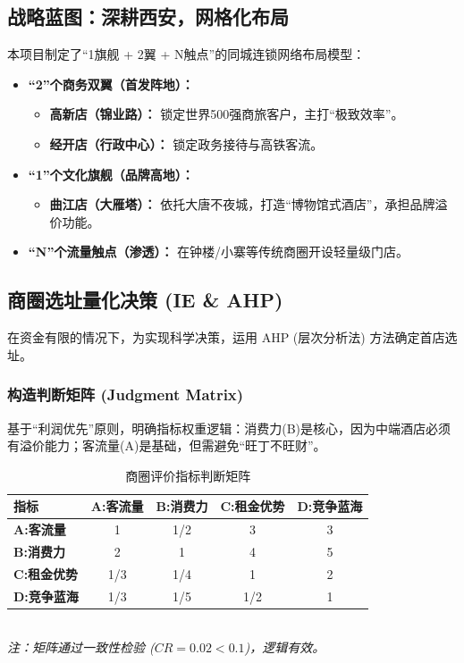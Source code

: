 \documentclass{cumcmthesis}
\begin{document}
\subsection{战略蓝图：深耕西安，网格化布局}
本项目制定了“1旗舰 + 2翼 + N触点”的同城连锁网络布局模型：
\begin{itemize}
    \item \textbf{“2”个商务双翼（首发阵地）：} 
    \begin{itemize}
        \item \textbf{高新店（锦业路）：} 锁定世界500强商旅客户，主打“极致效率”。
        \item \textbf{经开店（行政中心）：} 锁定政务接待与高铁客流。
    \end{itemize}
    \item \textbf{“1”个文化旗舰（品牌高地）：} 
    \begin{itemize}
        \item \textbf{曲江店（大雁塔）：} 依托大唐不夜城，打造“博物馆式酒店”，承担品牌溢价功能。
    \end{itemize}
    \item \textbf{“N”个流量触点（渗透）：} 在钟楼/小寨等传统商圈开设轻量级门店。
\end{itemize}

\subsection{商圈选址量化决策 (IE \& AHP)}
在资金有限的情况下，为实现科学决策，运用 AHP (层次分析法) 方法确定首店选址。

\subsubsection{构造判断矩阵 (Judgment Matrix)}
基于“利润优先”原则，明确指标权重逻辑：消费力(B)是核心，因为中端酒店必须有溢价能力；客流量(A)是基础，但需避免“旺丁不旺财”。

\begin{table}[H]
    \centering
    \caption{商圈评价指标判断矩阵}
    \begin{tabular}{l c c c c}
        \toprule
        \textbf{指标} & \textbf{A:客流量} & \textbf{B:消费力} & \textbf{C:租金优势} & \textbf{D:竞争蓝海} \\
        \midrule
        \textbf{A:客流量}   & 1 & 1/2 & 3 & 3 \\
        \textbf{B:消费力}   & 2 & 1 & 4 & 5 \\
        \textbf{C:租金优势} & 1/3 & 1/4 & 1 & 2 \\
        \textbf{D:竞争蓝海} & 1/3 & 1/5 & 1/2 & 1 \\
        \bottomrule
    \end{tabular}
    \\ \footnotesize{\textit{注：矩阵通过一致性检验 ($CR=0.02 < 0.1$)，逻辑有效。}}
\end{table}
\end{document}
